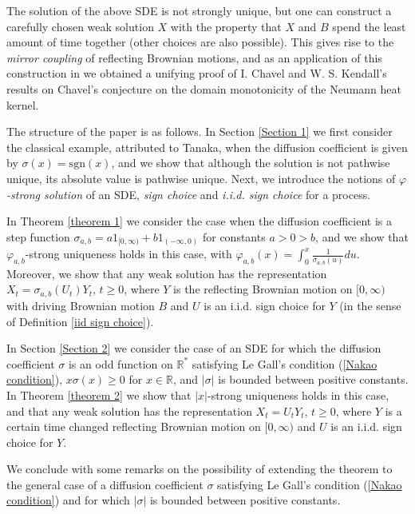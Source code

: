 \documentclass[reqno]{amsart}
\theoremstyle{definition}
\theoremstyle{remark}
\numberwithin{equation}{section}
\begin{document}
The solution of the above SDE is not strongly unique, but one can construct
a carefully chosen weak solution $X$ with the property that $X$ and $B$
spend the least amount of time together (other choices are also possible).
This gives rise to the \emph{mirror coupling} of reflecting Brownian motions, and as
an application of this construction in  \cite{Pascu} we obtained a unifying proof of I. Chavel
and W. S. Kendall's results on Chavel's conjecture on the domain
monotonicity of the Neumann heat kernel.

The structure of the paper is as follows. In Section \ref{Section 1} we
first consider the classical example, attributed to Tanaka, when the diffusion
coefficient is given by $\sigma \left( x\right) =\mathrm{sgn}\left(
x\right) $, and we show that although the solution is not pathwise unique, its
absolute value is pathwise unique. Next, we introduce the
notions of \emph{$\varphi $-strong solution} of an SDE, \emph{sign choice} and \emph{i.i.d. sign choice} for a
process.

In Theorem \ref{theorem 1} we consider the case when the diffusion
coefficient is a step
function $\sigma _{a,b}=a1_{[0,\infty )}+b1_{(-\infty ,0)}$ for constants $a>0>b$, and we show that $\varphi _{a,b}$-strong
uniqueness holds in this case, with $\varphi _{a,b}\left( x\right)
=\int_{0}^{x}\frac{1}{\sigma_{a,b} \left( u\right) }du$. Moreover, we show that
any weak solution has the representation $X_t=\sigma _{a,b}\left( U_{t}\right)
Y_{t}$, $t\ge 0$, where $Y$ is the reflecting Brownian motion on $[0,\infty)$
with driving Brownian motion $B$ and $U$ is an i.i.d. sign choice for $Y$ (in the sense of Definition \ref{iid sign choice}).

In Section \ref{Section 2} we consider the case of an SDE for which the
diffusion coefficient $\sigma $ is an odd function on $\mathbb{R}^\ast$ satisfying Le Gall's
condition (\ref{Nakao condition}), $x\sigma(x)\geq 0$ for $x\in\mathbb{R}$, and $\left\vert \sigma \right\vert $ is
bounded between positive constants. In Theorem \ref{theorem 2} we show that $\left\vert x\right\vert $-strong uniqueness holds in this case, and
that any weak solution has the representation $X_{t}=U_{t}Y_{t}$, $t\ge 0$, where $Y$ is a certain time changed reflecting Brownian motion on $[0,\infty)$ and $U$ is an i.i.d. sign choice for $Y$.

We conclude with some remarks on the possibility of extending the theorem to
the general case of a diffusion coefficient $\sigma $ satisfying Le Gall's
condition (\ref{Nakao condition}) and for which $\left\vert \sigma \right\vert $ is bounded between
positive constants.
\end{document}
